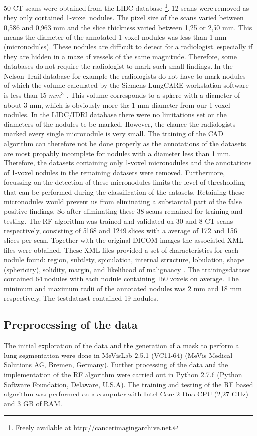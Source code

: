 50 CT scans were obtained from the LIDC database \footnote{Freely available
at \url{http://cancerimagingarchive.net}.}. 12 scans were removed as they only
contained 1-voxel nodules. The pixel size of the scans varied between 0,586 and
0,963 mm and the slice thickness varied between 1,25 or 2,50 mm. This means the
diameter of the annotated 1-voxel nodules was less than 1 mm (micronodules).
These nodules are difficult to detect for a radiologist, especially if they are
hidden in a maze of vessels of the same magnitude. Therefore, some databases do
not require the radiologist to mark such small findings. In the Nelson Trail
database for example the radiologists do not have to mark nodules of which the
volume calculated by the Siemens LungCARE workstation software is less than 15
$mm^3$ \cite{mur}. This volume corresponds to a sphere with a diameter of about
3 mm, which is obviously more the 1 mm diameter from our 1-voxel nodules.
In the LIDC/IDRI database there were no limitations set on the diameters of the
nodules to be marked. However, the chance the radiologists marked every single
micronodule is very small. The training of the CAD algorithm can therefore not
be done properly as the annotations of the datasets are most propably incomplete
for nodules with a diameter less than 1 mm. Therefore, the datasets containing
only 1-voxel micronodules and the annotations of 1-voxel nodules in the
remaining datasets were removed. Furthermore, focussing on the detection of
these micronodules limits the level of thresholding that can be performed during
the classification of the datasets. Retaining these micronodules would prevent
us from eliminating a substantial part of the false positive findings. So
after eliminating these 38 scans remained for training and testing.
The RF algorithm was trained and validated on 30 and 8 CT scans respectively,
consisting of 5168 and 1249 slices with a average of 172 and 156 slices per
scan. Together with the original DICOM images the associated XML files
were obtained. These XML files provided a set of characteristics for each nodule
found: region, subtlety, spiculation, internal structure, lobulation, shape
(sphericity), solidity, margin, and likelihood of malignancy \cite{lidcbase}.
The trainingsdataset contained 64 nodules with each nodule containing 150 voxels
on average. The minimum and maximum radii of the annotated nodules was 2 mm and
18 mm respectively. The testdataset contained 19 nodules.


\subsection{Preprocessing of the data}
The initial exploration of the data and the generation of a mask to perform a
lung segmentation were done in MeVisLab 2.5.1 (VC11-64) (MeVis Medical Solutions
AG, Bremen, Germany). Further processing of the data and the implementation of
the RF algorithm were carried out in Python 2.7.6 (Python Software Foundation,
Delaware, U.S.A).  The training and testing of the RF based algorithm was
performed on a computer with Intel Core 2 Duo CPU (2,27 GHz) and 3 GB of RAM.


